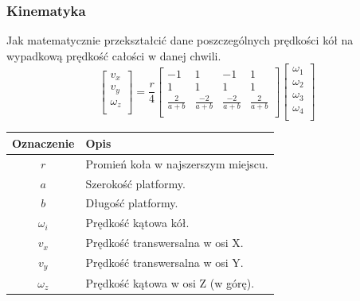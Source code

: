 \documentclass{beamer}
\begin{document}
	\begin{frame}
		\frametitle{Kinematyka}
		Jak matematycznie przekształcić dane poszczególnych prędkości kół na wypadkową prędkość całości w danej chwili.
		\[
		\begin{bmatrix}
		v_x \\
		v_y \\
		\omega_z \\
		\end{bmatrix}
		=
		\frac{r}{4}
		\begin{bmatrix}
		-1 & 1 & -1 & 1 \\
		1 & 1 & 1 & 1 \\
		\frac{2}{a+b} & \frac{-2}{a+b} & \frac{-2}{a+b} & \frac{2}{a+b} \\
		\end{bmatrix}
		\begin{bmatrix}
		\omega_1 \\
		\omega_2 \\
		\omega_3 \\
		\omega_4 \\
		\end{bmatrix}
		\]
		\begin{table}
		\centering
		\begin{tabular}{c l}
		Oznaczenie & Opis \\
		\hline
		$r$ &  Promień koła w najszerszym miejscu. \\
		$a$ &  Szerokość platformy. \\
		$b$ &  Długość platformy. \\
		$\omega_i$ &  Prędkość kątowa kół. \\
		$v_x$ &  Prędkość transwersalna w osi X. \\
		$v_y$ &  Prędkość transwersalna w osi Y. \\
		$\omega_z$ &  Prędkość kątowa w osi Z (w górę). \\
		\end{tabular}
		\end{table}
	\end{frame}
	
\end{document}
